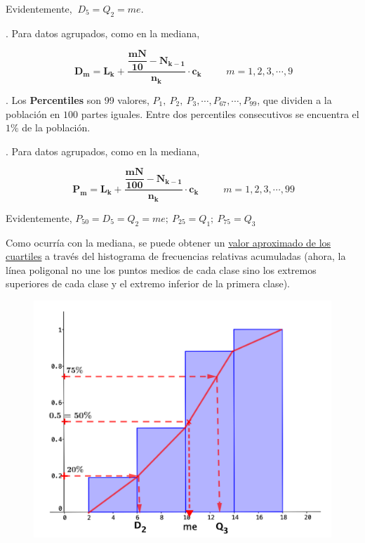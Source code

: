 Evidentemente, $\ D_5=Q_2=me$.

\vspace{5mm}%
\begin{theorem}
	. Para datos agrupados, como en la mediana, 
	
	$$\boxed{\ \boldsymbol{D_m=L_k+\dfrac{\dfrac{mN}{10}-N_{k-1}}{n_k}\cdot c_k} \ }\; \qquad m=1,2,3,\cdots , 9$$
	
\end{theorem}
	
\vspace{5mm}%
\begin{definition}
	. Los \textbf{Percentiles} son 99 valores, $P_1,\ P_2, \ P_3,  \cdots , P_{67}, \cdots, P_{99}$, que dividen a la población en $100$ partes iguales. Entre dos percentiles consecutivos se encuentra el $1\%$ de la población.	
\end{definition}

\vspace{5mm}%
\begin{theorem}
	. Para datos agrupados, como en la mediana, 
	
	$$\boxed{\ \boldsymbol{P_m=L_k+\dfrac{\dfrac{mN}{100}-N_{k-1}}{n_k}\cdot c_k} \ }\; \qquad m=1,2,3,\cdots , 99$$
\end{theorem}

Evidentemente, $P_{50}=D_5=Q_2=me;\ P_{25}=Q_1;\ P_{75}=Q_3$

Como ocurría con la mediana, se puede obtener un \underline{valor aproximado de los cuartiles} a través del histograma de frecuencias relativas acumuladas \textcolor{gris}{(ahora, la línea poligonal no une los puntos medios de cada clase sino los extremos superiores de cada clase y el extremo inferior de la primera clase)}.

	\begin{figure}[H]
			\centering
			\includegraphics[width=.75\textwidth]{imagenes/imagenes01/T01IM09_copia.png}
	\end{figure}

